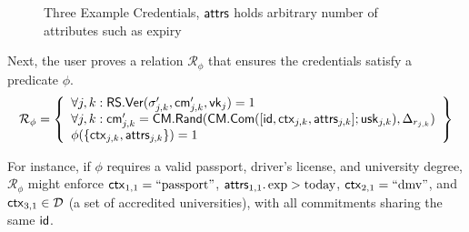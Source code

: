\begin{figure}
        \begin{pchstack}[boxed, center, space=4em]
            \begin{pcvstack}
            \end{pcvstack}
            \pcvspace
            \begin{pcvstack}
            \end{pcvstack}
            \pcvspace
            \begin{pcvstack}
            \end{pcvstack}
        \end{pchstack}
    \caption{Three Example Credentials, $\mathsf{attrs}$ holds arbitrary number of attributes such as expiry}
    \label{fig:three-creds}
\end{figure}

Next, the user proves a relation $\mathcal{R}_\phi$ that ensures the credentials satisfy a predicate $\phi$. 
\[
\mathcal{R}_\phi = \left\{ 
\begin{array}{l} 
\forall j, k: \mathsf{RS.Ver}(\sigma_{j,k}', \mathsf{cm}_{j,k}', \mathsf{vk}_j) = 1 \\ 
\forall j, k: \mathsf{cm}_{j,k}' = \mathsf{CM.Rand}(\mathsf{CM.Com}([\mathsf{id}, \mathsf{ctx}_{j,k}, \mathsf{attrs}_{j,k}]; \mathsf{usk}_{j,k}), \Delta_{r_{j,k}}) \\ 
\phi(\{\mathsf{ctx}_{j,k}, \mathsf{attrs}_{j,k}\}) = 1 
\end{array} 
\right\}
\]

For instance, if $\phi$ requires a valid passport, driver’s license, and university degree, $\mathcal{R}_\phi$ might enforce $\mathsf{ctx}_{1,1} = \text{``passport''}$, $\mathsf{attrs}_{1,1}.\exp > \text{today}$, $\mathsf{ctx}_{2,1} = \text{``dmv''}$, and $\mathsf{ctx}_{3,1} \in \mathcal{D}$ (a set of accredited universities), with all commitments sharing the same $\mathsf{id}$.

